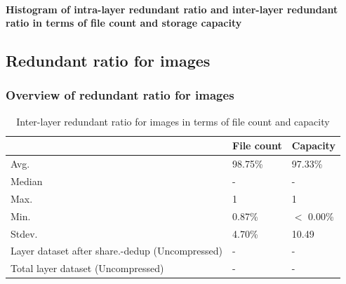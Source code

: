 
\paragraph{Histogram of intra-layer redundant ratio and inter-layer redundant ratio in terms of file count and storage capacity}


\subsection{Redundant ratio for images}

\subsubsection{Overview of redundant ratio for images}

\begin{table} 
	\centering 
	\scriptsize  
	\caption{Inter-layer redundant ratio for images in terms of file count and capacity} \label{tbl:intra_dup_ratio_images} 
	\begin{tabular}{|l|l|l|}%
		\hline 
		& File count & Capacity \\
		\hline
		Avg. & 98.75\% & 97.33\%\\
		\hline
		Median & - & - \\
		\hline
		Max. & 1 & 1\\
		\hline
		Min.  & 0.87\%  & $<$ 0.00\%\\
		\hline
		Stdev.  &  4.70\% & 10.49\\
		\hline
		Layer dataset after share.-dedup (Uncompressed) & -  & -\\
		\hline 
		Total layer dataset (Uncompressed) &  -	& -\\
		\hline
	\end{tabular} 
\end{table}

